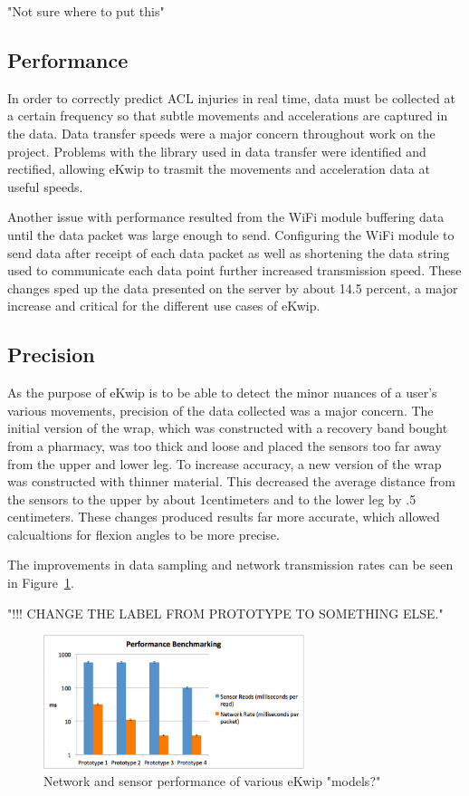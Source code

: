 "Not sure where to put this"
\subsection {Performance}
In order to correctly predict ACL injuries in real time, data must be collected at a certain frequency so that subtle movements and accelerations are captured in the data. Data transfer speeds were a major concern throughout work on the project. Problems with the library used in data transfer were identified and rectified, allowing eKwip to trasmit the movements and acceleration data at useful speeds.

Another issue with performance resulted from the WiFi module buffering data until the data packet was large enough to send.  Configuring the WiFi module to send data after receipt of each data packet as well as shortening the data string used to communicate each data point further increased transmission speed. These changes sped up the data presented on the server by about 14.5 percent, a major increase and critical for the different use cases of eKwip. 

\subsection {Precision}
As the purpose of eKwip is to be able to detect the minor nuances of a user’s various movements, precision of the data collected was a major concern. The initial version of the wrap, which was constructed with a recovery band bought from a pharmacy, was too thick and loose and placed the sensors too far away from the upper and lower leg. To increase accuracy, a new version of the wrap was constructed with thinner material. This decreased the average distance from the sensors to the upper by about 1centimeters and to the lower leg by .5 centimeters. These changes produced results far more accurate, which allowed calcualtions for flexion angles to be more precise. 



The improvements in data sampling and network transmission rates can be seen in Figure~\ref{fig:graph}.

"!!! CHANGE THE LABEL FROM PROTOTYPE TO SOMETHING ELSE."

\begin{figure}[h]
  \begin{center}
    \includegraphics[width=3in]{images/graph.png}
  \end{center}
  \caption{Network and sensor performance of various eKwip "models?"}
  \label{fig:graph}
\end{figure}






